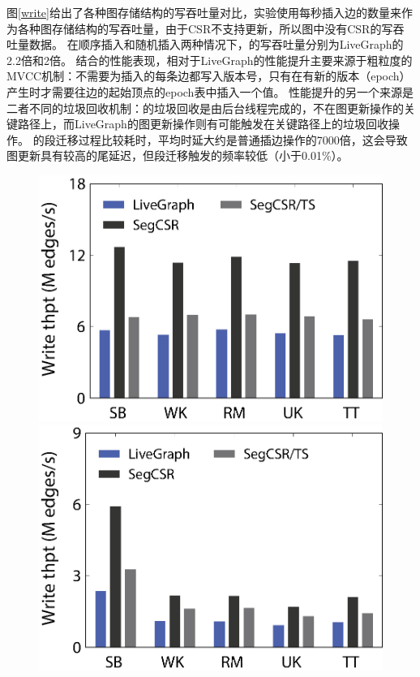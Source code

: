 图\ref{write}给出了各种图存储结构的写吞吐量对比，实验使用每秒插入边的数量来作为各种图存储结构的写吞吐量，由于CSR不支持更新，所以图中没有CSR的写吞吐量数据。
在顺序插入和随机插入两种情况下，\newstore 的写吞吐量分别为LiveGraph的2.2倍和2倍。
结合\store 的性能表现，\newstore 相对于LiveGraph的性能提升主要来源于粗粒度的MVCC机制：不需要为插入的每条边都写入版本号，只有在有新的版本（epoch）产生时才需要往边的起始顶点的epoch表中插入一个值。
性能提升的另一个来源是二者不同的垃圾回收机制：\newstore 的垃圾回收是由后台线程完成的，不在图更新操作的关键路径上，而LiveGraph的图更新操作则有可能触发在关键路径上的垃圾回收操作。
\newstore 的段迁移过程比较耗时，平均时延大约是普通插边操作的7000倍，这会导致图更新具有较高的尾延迟，但段迁移触发的频率较低（小于0.01\%）。

\begin{figure}[!hpt]
\centering
\begin{minipage}{.45\linewidth}
\centering\includegraphics[scale=0.55]{figures/write-seq.eps}
\end{minipage}
\begin{minipage}{.45\linewidth}
\centering\includegraphics[scale=0.55]{figures/write-ran.eps}

\end{minipage}
\end{figure}
